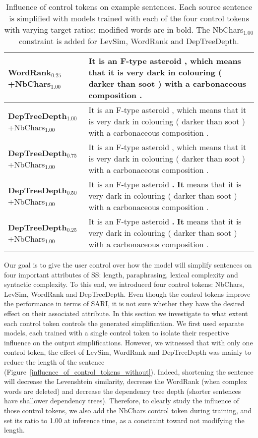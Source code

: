 \documentclass[10pt, a4paper]{article}
\begin{document}
\begin{table*}
{\begin{tabular}{ll}
\textbf{WordRank$_{0.25}$}\footnotesize{+NbChars$_{1.00}$} & It is an F-type asteroid , which means that it is very dark in colouring ( darker than soot ) with a carbonaceous composition . \\
\midrule
\textbf{DepTreeDepth$_{1.00}$}\footnotesize{+NbChars$_{1.00}$} & It is an F-type asteroid , which means that it is very dark in colouring ( darker than soot ) with a carbonaceous composition . \\
\textbf{DepTreeDepth$_{0.75}$}\footnotesize{+NbChars$_{1.00}$} & It is an F-type asteroid , which means that it is very dark in colouring ( darker than soot ) with a carbonaceous composition . \\
\textbf{DepTreeDepth$_{0.50}$}\footnotesize{+NbChars$_{1.00}$} & It is an F-type asteroid \textbf{.} \textbf{It} means that it is very dark in colouring ( darker than soot ) with a carbonaceous composition . \\
\textbf{DepTreeDepth$_{0.25}$}\footnotesize{+NbChars$_{1.00}$} & It is an F-type asteroid \textbf{.} \textbf{It} means that it is very dark in colouring ( darker than soot ) with a carbonaceous composition . \\
    \bottomrule

    \end{tabular}}
    \caption{Influence of control tokens on example sentences. Each source sentence is simplified with models trained with each of the four control tokens with varying target ratios; modified words are in bold. The NbChars$_{1.00}$ constraint is added for LevSim, WordRank and DepTreeDepth.
    \label{influence_of_control_tokens_on_examples}}
\end{table*}


Our goal is to give the user control over how the model will simplify sentences on four important attributes of SS: length, paraphrasing, lexical complexity and syntactic complexity.
To this end, we introduced four control tokens: NbChars, LevSim, WordRank and DepTreeDepth.
Even though the control tokens improve the performance in terms of SARI, it is not sure whether they have the desired effect on their associated attribute.
In this section we investigate to what extent each control token controls the generated simplification.
We first used separate models, each trained with a single control token to isolate their respective influence on the output simplifications.
However, we witnessed that with only one control token, the effect of LevSim, WordRank and DepTreeDepth was mainly to reduce the length of the sentence (Figure~\ref{influence_of_control_tokens_without}). Indeed, shortening the sentence will decrease the Levenshtein similarity, decrease the WordRank (when complex words are deleted) and decrease the dependency tree depth (shorter sentences have shallower dependency trees).
Therefore, to clearly study the influence of those control tokens, we also add the NbChars control token during training, and set its ratio to 1.00 at inference time, as a constraint toward not modifying the length.
\end{document}
